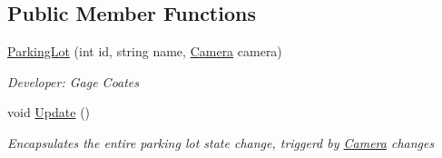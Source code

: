 \subsection*{Public Member Functions}
\begin{DoxyCompactItemize}
\item 
\mbox{\hyperlink{class_eagle_eye_1_1_models_1_1_parking_lot_a02ac70305c0a604f9123ccdb0aa5d323}{Parking\+Lot}} (int id, string name, \mbox{\hyperlink{class_eagle_eye_1_1_models_1_1_camera}{Camera}} camera)
\begin{DoxyCompactList}\small\item\em Developer\+: Gage Coates \end{DoxyCompactList}\item 
void \mbox{\hyperlink{class_eagle_eye_1_1_models_1_1_parking_lot_a7e3c86f8ba1c0de2e4d0a2ec7d14a653}{Update}} ()
\begin{DoxyCompactList}\small\item\em Encapsulates the entire parking lot state change, triggerd by \mbox{\hyperlink{class_eagle_eye_1_1_models_1_1_camera}{Camera}} changes \end{DoxyCompactList}\end{DoxyCompactItemize}
